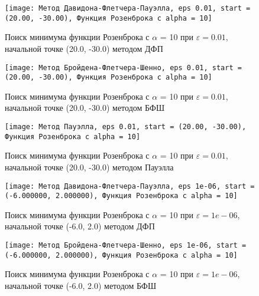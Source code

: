             \begin{figure}[H]
	        \centering
	        \texttt{[image: Метод Давидона-Флетчера-Пауэлла, eps 0.01, start = (20.00, -30.00), Функция Розенброка с alpha = 10]}%
	        \caption{Поиск минимума функции Розенброка с $\alpha$ = 10 при $\varepsilon = 0.01$, начальной точке (20.0, -30.0) методом ДФП}
	        \vspace*{-1.2cm}
            \end{figure}
            
            \begin{figure}[H]
	        \centering
	        \texttt{[image: Метод Бройдена-Флетчера-Шенно, eps 0.01, start = (20.00, -30.00), Функция Розенброка с alpha = 10]}%
	        \caption{Поиск минимума функции Розенброка с $\alpha$ = 10 при $\varepsilon = 0.01$, начальной точке (20.0, -30.0) методом БФШ}
	        \vspace*{-1.2cm}
            \end{figure}
            
            \begin{figure}[H]
	        \centering
	        \texttt{[image: Метод Пауэлла, eps 0.01, start = (20.00, -30.00), Функция Розенброка с alpha = 10]}%
	        \caption{Поиск минимума функции Розенброка с $\alpha$ = 10 при $\varepsilon = 0.01$, начальной точке (20.0, -30.0) методом Пауэлла}
	        \vspace*{-1.2cm}
            \end{figure}
            
            \begin{figure}[H]
	        \centering
	        \texttt{[image: Метод Давидона-Флетчера-Пауэлла, eps 1e-06, start = (-6.000000, 2.000000), Функция Розенброка с alpha = 10]}%
	        \caption{Поиск минимума функции Розенброка с $\alpha$ = 10 при $\varepsilon = 1e-06$, начальной точке (-6.0, 2.0) методом ДФП}
	        \vspace*{-1.2cm}
            \end{figure}
            
            \begin{figure}[H]
	        \centering
	        \texttt{[image: Метод Бройдена-Флетчера-Шенно, eps 1e-06, start = (-6.000000, 2.000000), Функция Розенброка с alpha = 10]}%
	        \caption{Поиск минимума функции Розенброка с $\alpha$ = 10 при $\varepsilon = 1e-06$, начальной точке (-6.0, 2.0) методом БФШ}
	        \vspace*{-1.2cm}
            \end{figure}
            
